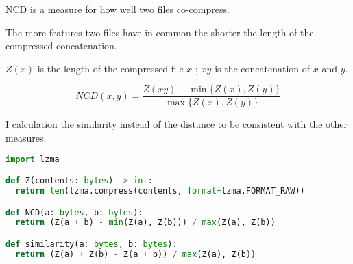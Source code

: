 \documentclass[../main.tex]{subfiles}
\begin{document}
NCD is a measure for how well two files co-compress.

The more features two files have in common the shorter the length of the compressed concatenation.

$Z(x)$ is the length of the compressed file $x$ ; $xy$ is the concatenation of $x$ and $y$.

\begin{equation}
  NCD(x,y) = \dfrac{Z(xy) - \min \{Z(x),Z(y)\}}{\max \{Z(x),Z(y)\}}
\end{equation}

I calculation the similarity instead of the distance to be consistent with the other measures.

\begin{lstlisting}[style=mystyle,language=Python]
import lzma

def Z(contents: bytes) -> int:
  return len(lzma.compress(contents, format=lzma.FORMAT_RAW))

def NCD(a: bytes, b: bytes):
  return (Z(a + b) - min(Z(a), Z(b))) / max(Z(a), Z(b))

def similarity(a: bytes, b: bytes):
  return (Z(a) + Z(b) - Z(a + b)) / max(Z(a), Z(b))
\end{lstlisting}
\end{document}
